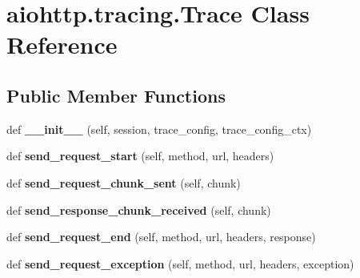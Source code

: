 \hypertarget{classaiohttp_1_1tracing_1_1_trace}{}\section{aiohttp.\+tracing.\+Trace Class Reference}
\label{classaiohttp_1_1tracing_1_1_trace}
\subsection*{Public Member Functions}
\begin{DoxyCompactItemize}
\item 
\mbox{\label{classaiohttp_1_1tracing_1_1_trace_a401a5c3c1f7c71172017f1499115078e}} 
def {\bfseries \+\_\+\+\_\+init\+\_\+\+\_\+} (self, session, trace\+\_\+config, trace\+\_\+config\+\_\+ctx)
\item 
\mbox{\label{classaiohttp_1_1tracing_1_1_trace_ac25ab4dbdbf475e54d65322ea676dcc2}} 
def {\bfseries send\+\_\+request\+\_\+start} (self, method, url, headers)
\item 
\mbox{\label{classaiohttp_1_1tracing_1_1_trace_ad6edb3a4abf7597c3e888697a10681b7}} 
def {\bfseries send\+\_\+request\+\_\+chunk\+\_\+sent} (self, chunk)
\item 
\mbox{\label{classaiohttp_1_1tracing_1_1_trace_a957eb0b9b769deb3f872d50325839275}} 
def {\bfseries send\+\_\+response\+\_\+chunk\+\_\+received} (self, chunk)
\item 
\mbox{\label{classaiohttp_1_1tracing_1_1_trace_ae697d4ae7db1f9382504e616e172c189}} 
def {\bfseries send\+\_\+request\+\_\+end} (self, method, url, headers, response)
\item 
\mbox{\label{classaiohttp_1_1tracing_1_1_trace_a290238e90fca43b05f9a0454e7986387}} 
def {\bfseries send\+\_\+request\+\_\+exception} (self, method, url, headers, exception)
\item 
\mbox{\label{classaiohttp_1_1tracing_1_1_trace_a8876c18183b51d7c3361e0b9892a76b6}} 

\end{DoxyCompactItemize}

